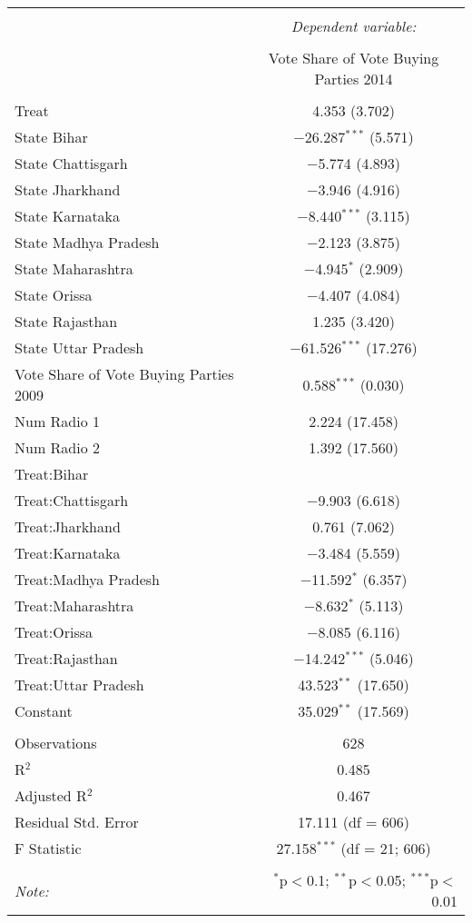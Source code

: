 
\begin{table}[!htbp] \centering 
  \caption{} 
  \label{} 
\begin{tabular}{@{\extracolsep{5pt}}lc} 
\\[-1.8ex]\hline 
\hline \\[-1.8ex] 
 & \multicolumn{1}{c}{\textit{Dependent variable:}} \\ 
\cline{2-2} 
\\[-1.8ex] & Vote Share of Vote Buying Parties 2014 \\ 
\hline \\[-1.8ex] 
 Treat & 4.353 (3.702) \\ 
  State Bihar & $-$26.287$^{***}$ (5.571) \\ 
  State Chattisgarh & $-$5.774 (4.893) \\ 
  State Jharkhand & $-$3.946 (4.916) \\ 
  State Karnataka & $-$8.440$^{***}$ (3.115) \\ 
  State Madhya Pradesh & $-$2.123 (3.875) \\ 
  State Maharashtra & $-$4.945$^{*}$ (2.909) \\ 
  State Orissa & $-$4.407 (4.084) \\ 
  State Rajasthan & 1.235 (3.420) \\ 
  State Uttar Pradesh & $-$61.526$^{***}$ (17.276) \\ 
  Vote Share of Vote Buying Parties 2009 & 0.588$^{***}$ (0.030) \\ 
  Num Radio 1 & 2.224 (17.458) \\ 
  Num Radio 2 & 1.392 (17.560) \\ 
  Treat:Bihar &  \\ 
  Treat:Chattisgarh & $-$9.903 (6.618) \\ 
  Treat:Jharkhand & 0.761 (7.062) \\ 
  Treat:Karnataka & $-$3.484 (5.559) \\ 
  Treat:Madhya Pradesh & $-$11.592$^{*}$ (6.357) \\ 
  Treat:Maharashtra & $-$8.632$^{*}$ (5.113) \\ 
  Treat:Orissa & $-$8.085 (6.116) \\ 
  Treat:Rajasthan & $-$14.242$^{***}$ (5.046) \\ 
  Treat:Uttar Pradesh & 43.523$^{**}$ (17.650) \\ 
  Constant & 35.029$^{**}$ (17.569) \\ 
 \hline \\[-1.8ex] 
Observations & 628 \\ 
R$^{2}$ & 0.485 \\ 
Adjusted R$^{2}$ & 0.467 \\ 
Residual Std. Error & 17.111 (df = 606) \\ 
F Statistic & 27.158$^{***}$ (df = 21; 606) \\ 
\hline 
\hline \\[-1.8ex] 
\textit{Note:}  & \multicolumn{1}{r}{$^{*}$p$<$0.1; $^{**}$p$<$0.05; $^{***}$p$<$0.01} \\ 
\end{tabular} 
\end{table} 
